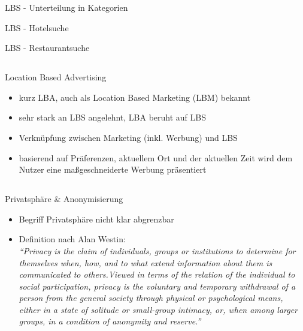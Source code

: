 \begin{frame}{LBS - Unterteilung in Kategorien}
  \begin{center}
  \end{center}
\end{frame}

\begin{frame}{LBS - Hotelsuche}
  \begin{center}
  \end{center}
\end{frame}

\begin{frame}{LBS - Restaurantsuche}
  \begin{center}
  \end{center}
\end{frame}

\subsection{}
\begin{frame}{Location Based Advertising}
\begin{itemize}
  \item kurz LBA, auch als Location Based Marketing (LBM) bekannt
  \item sehr stark an LBS angelehnt, LBA beruht auf LBS
  \item Verknüpfung zwischen Marketing (inkl. Werbung) und LBS
  \item basierend auf Präferenzen, aktuellem Ort und der aktuellen Zeit wird dem Nutzer eine maßgeschneiderte Werbung präsentiert
\end{itemize}
\end{frame}

\subsection{}
\begin{frame}{Privatsphäre \& Anonymisierung}
\begin{itemize}
  \item Begriff Privatsphäre nicht klar abgrenzbar
  \item Definition nach Alan Westin: \\ \vspace{.5cm}
  \textit{"`Privacy is the claim of individuals, groups or institutions to determine for themselves when, how, and to what extend information about them is communicated to others.Viewed in terms of the relation of the individual to social participation, privacy is the voluntary and temporary withdrawal of a person from the general society through physical or psychological means, either in a state of solitude or small-group intimacy, or, when among larger groups, in a condition of anonymity and reserve."'}
\end{itemize}
\end{frame}

